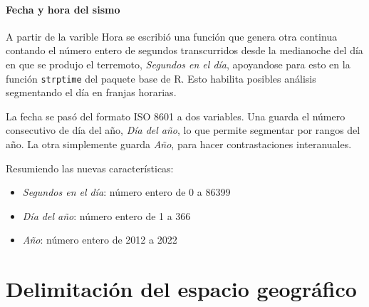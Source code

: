 \documentclass[a4paper]{report}
\begin{document}
\paragraph{Fecha y hora del sismo}
A partir de la varible Hora se escribió una función que genera otra continua contando el número entero de segundos transcurridos desde la medianoche del día en que se produjo el terremoto, \emph{Segundos en el día}, apoyandose para esto en la función \verb'strptime' del paquete base de R.
Esto habilita posibles análisis segmentando el día en franjas horarias.

La fecha se pasó del formato ISO 8601 a dos variables.
Una guarda el número consecutivo de día del año, \emph{Día del año}, lo que permite segmentar por rangos del año.
La otra simplemente guarda \emph{Año}, para hacer contrastaciones interanuales.

Resumiendo las nuevas características:
\begin{itemize}
	\item \emph{Segundos en el día}: número entero de 0 a 86399
	\item \emph{Día del año}: número entero de 1 a 366
	\item \emph{Año}: número entero de 2012 a 2022
\end{itemize}





\section{Delimitación del espacio geográfico}
\end{document}
